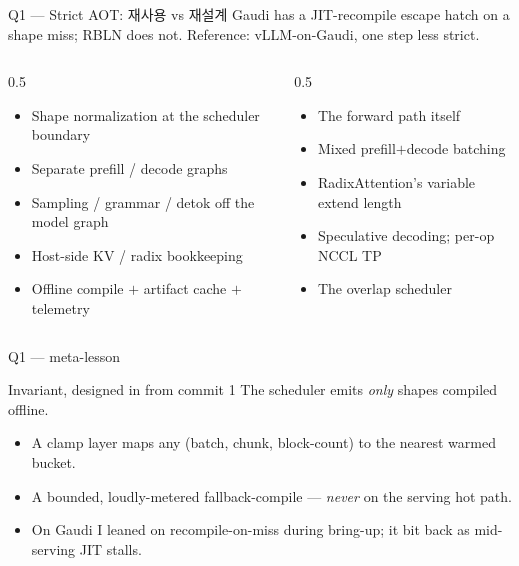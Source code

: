 \begin{frame}{Q1 — Strict AOT: 재사용 vs 재설계}
   Gaudi has a JIT-recompile escape hatch on a shape miss; RBLN does not.
  Reference: vLLM-on-Gaudi, one step less strict.
  \vspace{2pt}
  \begin{columns}[T]
    \begin{column}{0.5\textwidth}
      \begin{itemize}
        \item Shape normalization at the scheduler boundary
        \item Separate prefill / decode graphs
        \item Sampling / grammar / detok off the model graph
        \item Host-side KV / radix bookkeeping
        \item Offline compile $+$ artifact cache $+$ telemetry
      \end{itemize}
    \end{column}
    \begin{column}{0.5\textwidth}
      \begin{itemize}
        \item The forward path itself
        \item Mixed prefill$+$decode batching
        \item RadixAttention's variable extend length
        \item Speculative decoding; per-op NCCL TP
        \item The overlap scheduler
      \end{itemize}
    \end{column}
  \end{columns}
\end{frame}

\begin{frame}{Q1 — meta-lesson}
  \begin{alertblock}{Invariant, designed in from commit 1}
    The scheduler emits \emph{only} shapes compiled offline.
  \end{alertblock}
  \begin{itemize}\setlength\itemsep{5pt}
    \item A clamp layer maps any (batch, chunk, block-count) to the nearest warmed bucket.
    \item A bounded, loudly-metered fallback-compile — \emph{never} on the serving hot path.
    \item On Gaudi I leaned on recompile-on-miss during bring-up; it bit back as mid-serving JIT stalls.
  \end{itemize}
\end{frame}
